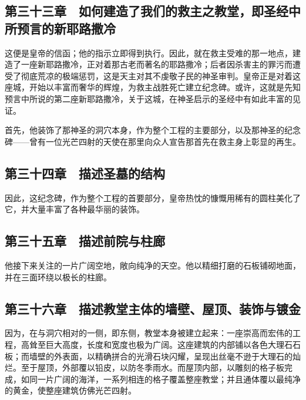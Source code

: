 
\subsection{第三十三章　如何建造了我们的救主之教堂，即圣经中所预言的新耶路撒冷}

这便是皇帝的信函；他的指示立即得到执行。因此，就在救主受难的那一地点，建造了一座新耶路撒冷，正对着那古老而著名的耶路撒冷；后者因杀害主的罪污而遭受了彻底荒凉的极端惩罚，这是天主对其不虔敬子民的神圣审判。皇帝正是对着这座城，开始以丰富而奢华的辉煌，为救主战胜死亡建立纪念碑。或许，这就是先知预言中所说的第二座新耶路撒冷，关于这城，在神圣启示的圣经中有如此丰富的见证。\par

首先，他装饰了那神圣的洞穴本身，作为整个工程的主要部分，以及那神圣的纪念碑——曾有一位光芒四射的天使在那里向众人宣告那首先在救主身上彰显的再生。\par


\subsection{第三十四章　描述圣墓的结构}

因此，这纪念碑，作为整个工程的首要部分，皇帝热忱的慷慨用稀有的圆柱美化了它，并大量丰富了各种最华丽的装饰。\par


\subsection{第三十五章　描述前院与柱廊}

他接下来关注的一片广阔空地，敞向纯净的天空。他以精细打磨的石板铺砌地面，并在三面环绕以极长的柱廊。\par


\subsection{第三十六章　描述教堂主体的墙壁、屋顶、装饰与镀金}

因为，在与洞穴相对的一侧，即东侧，教堂本身被建立起来：一座崇高而宏伟的工程，高耸至巨大高度，长度和宽度也极为广阔。这座建筑的内部铺以各色大理石石板；而墙壁的外表面，以精确拼合的光滑石块闪耀，呈现出丝毫不逊于大理石的灿烂。至于屋顶，外部覆以铅皮，以防冬季雨水。而屋顶内部，以雕刻的格子板完成，如同一片广阔的海洋，一系列相连的格子覆盖整座教堂；并且通体覆以最纯净的黄金，使整座建筑仿佛光芒四射。\par

